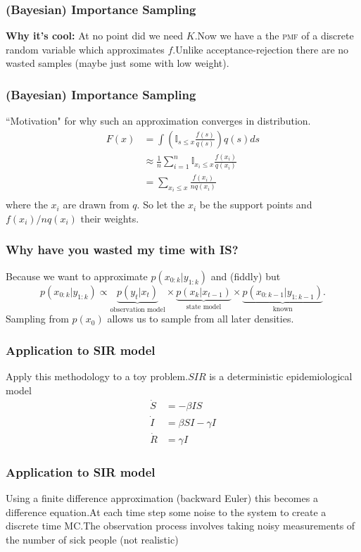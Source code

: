 \documentclass{beamer}
\begin{document}
\frame
{
\frametitle{(Bayesian) Importance Sampling}
\textbf{Why it's cool:} At no point did we need $K$.\newline\newline Now we have a the \textsc{pmf} of a discrete random variable which approximates $f$.\newline\newline Unlike acceptance-rejection there are no wasted samples (maybe just some with low weight).
}

\frame
{
\frametitle{(Bayesian) Importance Sampling}
``Motivation" for why such an approximation converges in distribution.
\begin{equation}
\begin{aligned}
F(x)&= \int\left( \mathbb{I}_{s\leq x}\frac{f(s)}{q(s)}\right)q(s)ds\\
&\approx \frac{1}{n}\sum_{i=1}^n  \mathbb{I}_{x_i\leq x}\frac{f(x_i)}{q(x_i)}\\
&= \sum_{x_i\leq x}\frac{f(x_i)}{nq(x_i)}\\
\end{aligned}
\end{equation}
where the $x_i$ are drawn from $q$. So let the $x_i$ be the support points and $f(x_i)/n q(x_i)$ their weights.
}

\frame
{
\frametitle{Why have you wasted my time with IS?}
Because we want to approximate $p(x_{0:k}|y_{1:k})$ and (fiddly) but
\begin{equation}
p(x_{0:k}|y_{1:k})\propto \underbrace{p(y_t|x_t)}_{\text{observation model}}\times\underbrace{p(x_k|x_{t-1})}_{\text{state model}}\times\underbrace{p(x_{0:k-1}|y_{1:k-1})}_{\text{known}}.
\end{equation}
Sampling from $p(x_0)$ allows us to sample from all later densities.
}

\frame
{
\frametitle{Application to SIR model}
Apply this methodology to a toy problem.\newline\newline $SIR$ is a deterministic epidemiological model
\begin{equation}
\begin{aligned}
\dot{S} &= -\beta IS\\
\dot{I} &= \beta SI - \gamma I\\
\dot{R} &= \gamma I
\end{aligned}
\end{equation}
}

\frame
{
\frametitle{Application to SIR model}
Using a finite difference approximation (backward Euler) this becomes a difference equation.\newline\newline At each time step some noise to the system to create a discrete time MC.\newline\newline The observation process involves taking noisy measurements of the number of sick people (not realistic)
}
\end{document}
